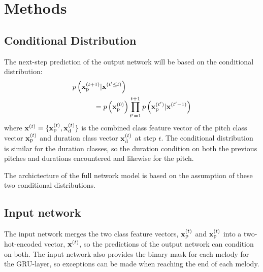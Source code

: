 \section{Methods}
\label{sec:method}

\subsection{Conditional Distribution} %
\label{sub:conditional_distribution}
The next-step prediction of the output network will be based on the conditional distribution:
	\begin{gather}
		\begin{split}
		\MoveEqLeft[3]
				p\left(\vec{x}\order{t+1}\idx{p}|\vec{x}\order{t'\le t}\right) \\ 
				& = p\left(\vec{x}\order{0}\idx{p}\right) \prod^{t+1}_{t'=1} p\left(\vec{x}\order{t'}\idx{p}|\vec{x}\order{t'-1}\right) \label{}
		\end{split} 	
	\end{gather}
	where $\bm{\mathrm{x}}^{(t)}=\{\bm{\mathrm{x}}^{(t)}_{\text{p}}, \bm{\mathrm{x}}^{(t)}_{\text{d}}\}$ is the combined class feature vector of the pitch class vector $\bm{\mathrm{x}}^{(t)}_{\text{p}}$ and duration class vector $\bm{\mathrm{x}}^{(t)}_{\text{d}}$ at step $t$. The conditional distribution is similar for the duration classes, so the duration condition on both the previous pitches and durations encountered and likewise for the pitch. 

	The archictecture of the full network model is based on the assumption of these two conditional distributions.

\subsection{Input network} %
\label{sub:input_network}
The input network merges the two class feature vectors, $\bm{\mathrm{x}}^{(t)}_{\text{p}}$ and $\bm{\mathrm{x}}^{(t)}_{\text{p}}$ into a two-hot-encoded vector, $\bm{\mathrm{x}}^{(t)}$, so the predictions of the output network can condition on both. The input network also provides the binary mask for each melody for the GRU-layer, so exceptions can be made when reaching the end of each melody.


